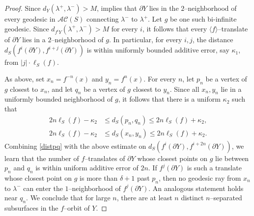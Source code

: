 \documentclass[11pt,letterpaper]{amsart}
\newcommand{\bdy}{\partial} %
\numberwithin{equation}{section}
\theoremstyle{definition}
\newcommand{\AC}{\mathcal{AC}}
\begin{document}
\begin{proof}
Since $d_{Y}(\lambda^{+}, \lambda^{-}) > M$,  implies that $\bdy Y$ lies in the $2$--neighborhood of every geodesic in $\AC(S)$ connecting $\lambda^{-}$ to $\lambda^{+}$. Let $g$ be one such bi-infinite geodesic. Since $d_{f^iY}(\lambda^{+}, \lambda^{-}) > M$ for every $i$, 
it follows that 
every $\langle f \rangle$--translate of $\bdy Y$
 lies in a $2$--neighborhood of $g$. In particular, for every $i,j$, the distance $d_S(f^i(\bdy Y), f^{i+j}(\bdy Y))$ is within uniformly bounded additive error, say $\kappa_{1}$, from $|j| \cdot \ell_{S}(f)$.

As above, set $x_n = f^{-n}(x)$ and $y_n = f^n(x)$. For every $n$, let $p_n$ be a vertex of $g$ closest  to $x_n$, and let $q_n$ be a vertex of $g$ closest to $y_n$. Since all $x_n, y_n$ lie in a uniformly bounded neighborhood of $g$, it follows that there is a uniform $\kappa_2$ such that
\begin{align}
2n \ell_S(f) - \kappa_2 & \leq d_S(p_n, q_n)  \leq 2n \ell_S(f) + \kappa_2, \label{distpq} \\
2n \ell_S(f) - \kappa_2 & \leq d_S(x_n, y_n)  \leq 2n \ell_S(f) + \kappa_2. \label{distxy}
\end{align}
Combining \eqref{distpq} with the above estimate on $d_S(f^i(\bdy Y), f^{i+2n}(\bdy Y))$, we learn that the number of $f$--translates of $\bdy Y$ whose closest points on $g$ lie between $p_n$ and $q_n$ is within  uniform additive error of $2n$. If $f^j(\bdy Y)$ is such a translate whose closest point on $g$ is more than $\delta+1$ past $p_n$, then no geodesic ray from $x_n$ to $\lambda^-$ can enter the $1$--neighborhood of $f^j(\bdy Y)$. An analogous statement holds near $q_n$. We conclude that for large $n$, there are at least $n$ distinct $n$--separated subsurfaces in the $f$--orbit of $Y$.
\end{proof}
\end{document}
